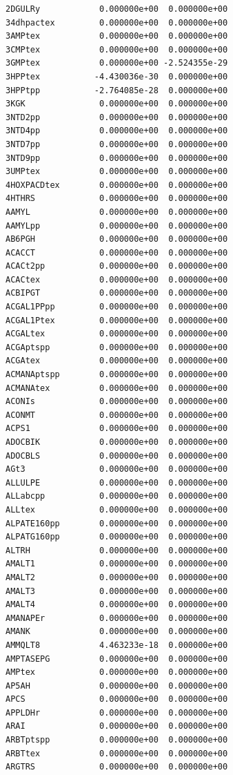 \documentclass{scrartcl}
\begin{document}
\begin{enumerate}
\begin{lstlisting}
2DGULRy            0.000000e+00  0.000000e+00
34dhpactex         0.000000e+00  0.000000e+00
3AMPtex            0.000000e+00  0.000000e+00
3CMPtex            0.000000e+00  0.000000e+00
3GMPtex            0.000000e+00 -2.524355e-29
3HPPtex           -4.430036e-30  0.000000e+00
3HPPtpp           -2.764085e-28  0.000000e+00
3KGK               0.000000e+00  0.000000e+00
3NTD2pp            0.000000e+00  0.000000e+00
3NTD4pp            0.000000e+00  0.000000e+00
3NTD7pp            0.000000e+00  0.000000e+00
3NTD9pp            0.000000e+00  0.000000e+00
3UMPtex            0.000000e+00  0.000000e+00
4HOXPACDtex        0.000000e+00  0.000000e+00
4HTHRS             0.000000e+00  0.000000e+00
AAMYL              0.000000e+00  0.000000e+00
AAMYLpp            0.000000e+00  0.000000e+00
AB6PGH             0.000000e+00  0.000000e+00
ACACCT             0.000000e+00  0.000000e+00
ACACt2pp           0.000000e+00  0.000000e+00
ACACtex            0.000000e+00  0.000000e+00
ACBIPGT            0.000000e+00  0.000000e+00
ACGAL1PPpp         0.000000e+00  0.000000e+00
ACGAL1Ptex         0.000000e+00  0.000000e+00
ACGALtex           0.000000e+00  0.000000e+00
ACGAptspp          0.000000e+00  0.000000e+00
ACGAtex            0.000000e+00  0.000000e+00
ACMANAptspp        0.000000e+00  0.000000e+00
ACMANAtex          0.000000e+00  0.000000e+00
ACONIs             0.000000e+00  0.000000e+00
ACONMT             0.000000e+00  0.000000e+00
ACPS1              0.000000e+00  0.000000e+00
ADOCBIK            0.000000e+00  0.000000e+00
ADOCBLS            0.000000e+00  0.000000e+00
AGt3               0.000000e+00  0.000000e+00
ALLULPE            0.000000e+00  0.000000e+00
ALLabcpp           0.000000e+00  0.000000e+00
ALLtex             0.000000e+00  0.000000e+00
ALPATE160pp        0.000000e+00  0.000000e+00
ALPATG160pp        0.000000e+00  0.000000e+00
ALTRH              0.000000e+00  0.000000e+00
AMALT1             0.000000e+00  0.000000e+00
AMALT2             0.000000e+00  0.000000e+00
AMALT3             0.000000e+00  0.000000e+00
AMALT4             0.000000e+00  0.000000e+00
AMANAPEr           0.000000e+00  0.000000e+00
AMANK              0.000000e+00  0.000000e+00
AMMQLT8            4.463233e-18  0.000000e+00
AMPTASEPG          0.000000e+00  0.000000e+00
AMPtex             0.000000e+00  0.000000e+00
AP5AH              0.000000e+00  0.000000e+00
APCS               0.000000e+00  0.000000e+00
APPLDHr            0.000000e+00  0.000000e+00
ARAI               0.000000e+00  0.000000e+00
ARBTptspp          0.000000e+00  0.000000e+00
ARBTtex            0.000000e+00  0.000000e+00
ARGTRS             0.000000e+00  0.000000e+00

\end{lstlisting}
\end{enumerate}
\end{document}
